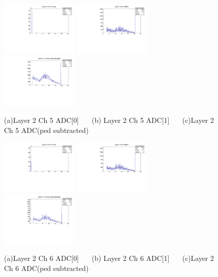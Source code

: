 \documentclass[a4paper,11pt]{article}
\theoremstyle{mytheor}
\begin{document}
\begin{figure}[H] 
\vspace*{-0.3cm} 
\includegraphics[width=0.33\textwidth,scale=0.5,trim=0 0 0 0,clip]{plotsdir/file0_test-Layer2_Ch5_adc0-1.pdf} 
\includegraphics[width=0.33\textwidth,scale=0.5,trim=0 0 0 0,clip]{plotsdir/file0_test-Layer2_Ch5_adc1-1.pdf} 
\includegraphics[width=0.33\textwidth,scale=0.5,trim=0 0 0 0,clip]{plotsdir/file0_test-Layer2_Ch5_adcPedsub-1.pdf} 
\caption{(a)Layer 2 Ch 5 ADC[0] ~~~(b) Layer 2 Ch 5 ADC[1] ~~~(c)Layer 2 Ch 5 ADC(ped subtracted) } 
\end{figure} 
\begin{figure}[H] 
\vspace*{-0.3cm} 
\includegraphics[width=0.33\textwidth,scale=0.5,trim=0 0 0 0,clip]{plotsdir/file0_test-Layer2_Ch6_adc0-1.pdf} 
\includegraphics[width=0.33\textwidth,scale=0.5,trim=0 0 0 0,clip]{plotsdir/file0_test-Layer2_Ch6_adc1-1.pdf} 
\includegraphics[width=0.33\textwidth,scale=0.5,trim=0 0 0 0,clip]{plotsdir/file0_test-Layer2_Ch6_adcPedsub-1.pdf} 
\caption{(a)Layer 2 Ch 6 ADC[0] ~~~(b) Layer 2 Ch 6 ADC[1] ~~~(c)Layer 2 Ch 6 ADC(ped subtracted) } 
\end{figure} 
\end{document}
